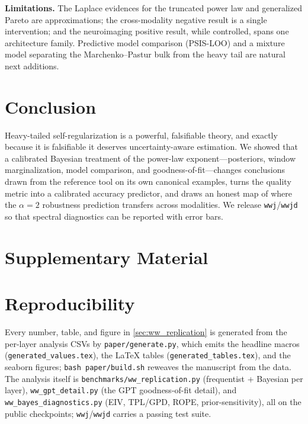 \documentclass{article} %
\begin{document}
\textbf{Limitations.} The Laplace evidences for the truncated power law and generalized Pareto are
approximations; the cross-modality negative result is a single intervention; and the neuroimaging positive
result, while controlled, spans one architecture family. Predictive model comparison (PSIS-LOO) and a
mixture model separating the Marchenko--Pastur bulk from the heavy tail are natural next additions.

\section{Conclusion}
\label{sec:conclusion}

Heavy-tailed self-regularization is a powerful, falsifiable theory, and exactly because it is falsifiable
it deserves uncertainty-aware estimation. We showed that a calibrated Bayesian treatment of the power-law
exponent---posteriors, window marginalization, model comparison, and goodness-of-fit---changes conclusions
drawn from the reference tool on its own canonical examples, turns the quality metric into a calibrated
accuracy predictor, and draws an honest map of where the $\alpha = 2$ robustness prediction transfers across
modalities. We release \texttt{wwj}/\texttt{wwjd} so that spectral diagnostics can be reported with error bars.




\appendix
\section*{\LARGE Supplementary Material}

\section{Reproducibility}
\label{sec:appendix_repro}
Every number, table, and figure in \cref{sec:ww_replication} is generated from the
per-layer analysis CSVs by \texttt{paper/generate.py}, which emits the headline macros
(\texttt{generated\_values.tex}), the \LaTeX{} tables (\texttt{generated\_tables.tex}), and
the seaborn figures; \texttt{bash paper/build.sh} reweaves the manuscript from the data.
The analysis itself is \texttt{benchmarks/ww\_replication.py} (frequentist + Bayesian per
layer), \texttt{ww\_gpt\_detail.py} (the GPT goodness-of-fit detail), and
\texttt{ww\_bayes\_diagnostics.py} (EIV, TPL/GPD, ROPE, prior-sensitivity), all on the
public checkpoints; \texttt{wwj}/\texttt{wwjd} carries a passing test suite.
\end{document}
